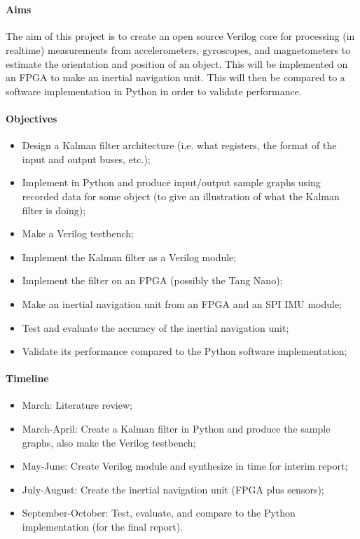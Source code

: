 \documentclass[12pt]{article}
\begin{document}
 \\

\paragraph{Aims}

The aim of this project is to create an open source Verilog core for processing (in realtime) measurements from accelerometers, gyroscopes, and magnetometers to estimate the orientation and position of an object. This will be implemented on an FPGA to make an inertial navigation unit. This will then be compared to a software implementation in Python in order to validate performance.

\paragraph{Objectives}

\begin{itemize}[noitemsep]
\item Design a Kalman filter architecture (i.e. what registers, the format of the input and output buses, etc.);
\item Implement in Python and produce input/output sample graphs using recorded data for some object (to give an illustration of what the Kalman filter is doing);
\item Make a Verilog testbench;
\item Implement the Kalman filter as a Verilog module;
\item Implement the filter on an FPGA (possibly the Tang Nano);
\item Make an inertial navigation unit from an FPGA and an SPI IMU module;
\item Test and evaluate the accuracy of the inertial navigation unit;
\item Validate its performance compared to the Python software implementation;
\end{itemize}

\paragraph{Timeline}
\begin{itemize}[noitemsep]
\item March: Literature review;
\item March-April: Create a Kalman filter in Python and produce the sample graphs, also make the Verilog testbench;
\item May-June: Create Verilog module and synthesize in time for interim report;
\item July-August: Create the inertial navigation unit (FPGA plus sensors);
\item September-October: Test, evaluate, and compare to the Python implementation (for the final report).
\end{itemize}
\end{document}
